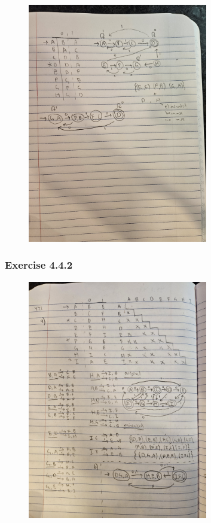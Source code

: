 \documentclass{article}
\theoremstyle{theorem}
\theoremstyle{definition}
\theoremstyle{remark}
\begin{document}
\begin{figure}[H]
    \centering
    \includegraphics[angle=-90, width=0.7\textwidth]{latexImages/hw5-4.4.1-b.jpg} 
\end{figure}

\subsubsection{Exercise 4.4.2}

\begin{figure}[H]
    \centering
    \includegraphics[angle=-90, width=0.7\textwidth]{latexImages/hw5-4.4.2.jpg} 
\end{figure}
\end{document}
